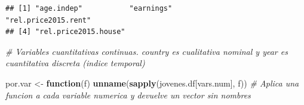 \documentclass[water,article,submit,pdftex,moreauthors]{Definitions/mdpi}
\newenvironment{Shaded}{\begin{snugshade}}{\end{snugshade}}
\newcommand{\CommentTok}[1]{\textcolor[rgb]{0.56,0.35,0.01}{\textit{#1}}}
\newcommand{\ControlFlowTok}[1]{\textcolor[rgb]{0.13,0.29,0.53}{\textbf{#1}}}
\newcommand{\FunctionTok}[1]{\textcolor[rgb]{0.13,0.29,0.53}{\textbf{#1}}}
\newcommand{\NormalTok}[1]{#1}
\newcommand{\OtherTok}[1]{\textcolor[rgb]{0.56,0.35,0.01}{#1}}
\begin{document}
\begin{verbatim}
## [1] "age.indep"           "earnings"            "rel.price2015.rent" 
## [4] "rel.price2015.house"
\end{verbatim}

\begin{Shaded}
\begin{Highlighting}[]
\CommentTok{\# Variables cuantitativas continuas. \textquotesingle{}country\textquotesingle{} es cualitativa nominal y \textquotesingle{}year\textquotesingle{} es cuantitativa discreta (indice temporal)}

\NormalTok{por.var }\OtherTok{\textless{}{-}} \ControlFlowTok{function}\NormalTok{(f) }\FunctionTok{unname}\NormalTok{(}\FunctionTok{sapply}\NormalTok{(jovenes.df[vars.num], f))}
\CommentTok{\# Aplica una funcion a cada variable numerica y devuelve un vector sin nombres}
\end{Highlighting}
\end{Shaded}
\end{document}
